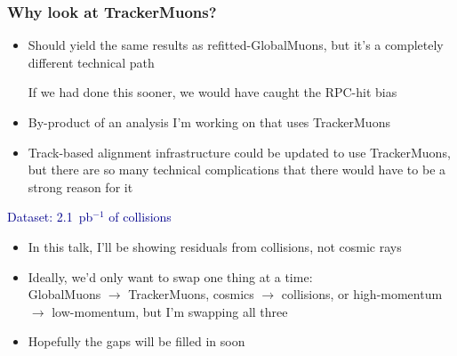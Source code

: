 \documentclass[compress]{beamer}
\begin{document}
\begin{frame}
\frametitle{Why look at TrackerMuons?}
\begin{itemize}
\item Should yield the same results as refitted-GlobalMuons, but it's a completely different technical path

If we had done this sooner, we would have caught the RPC-hit bias
\item By-product of an analysis I'm working on that uses TrackerMuons
\item Track-based alignment infrastructure could be updated to use
  TrackerMuons, but there are so many technical complications
  that there would have to be a strong reason for it
\end{itemize}

\vfill
\hspace{-0.83 cm} \textcolor{darkblue}{\Large Dataset: 2.1~pb$^{-1}$ of collisions}

\vspace{0.2 cm}
\begin{itemize}
\item In this talk, I'll be showing residuals from collisions, not cosmic rays
\item Ideally, we'd only want to swap one thing at a time: \\ GlobalMuons $\to$ TrackerMuons, cosmics $\to$ collisions, or high-momentum $\to$ low-momentum, but I'm swapping all three
\item Hopefully the gaps will be filled in soon
\end{itemize}
\end{frame}
\end{document}
